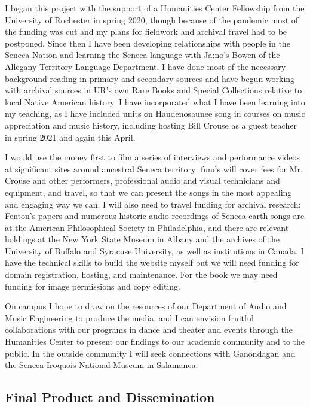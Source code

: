 \documentclass{neh}
\begin{document}
I began this project with the support of a Humanities Center Fellowship from
the University of Rochester in spring 2020, though because of the pandemic
most of the funding was cut and my plans for fieldwork and archival travel had
to be postponed.
Since then I have been developing relationships with people in the Seneca
Nation and learning the Seneca language with Ja:no's Bowen of the Allegany
Territory Language Department.
I have done most of the necessary background reading in primary and secondary
sources and have begun working with archival sources in UR's own Rare Books and
Special Collections relative to local Native American history.
I have incorporated what I have been learning into my teaching, as I have
included units on Haudenosaunee song in courses on music appreciation and
music history, including hosting Bill Crouse as a guest teacher in spring 2021
and again this April.


I would use the money first to film a series of interviews and performance
videos at significant sites around ancestral Seneca territory: funds will
cover fees for Mr. Crouse and other performers, professional audio and visual
technicians and equipment, and travel, so that we can present the songs in the
most appealing and engaging way we can.
I will also need to travel funding for archival research: Fenton's papers
and numerous historic audio recordings of Seneca earth songs are at the
American Philosophical Society in Philadelphia, and there are relevant
holdings at the New York State Museum in Albany and the archives of the
University of Buffalo and Syracuse University, as well as institutions in
Canada.
I have the technical skills to build the website myself but we will need
funding for domain registration, hosting, and maintenance.
For the book we may need funding for image permissions and copy editing.

On campus I hope to draw on the resources of our Department of Audio and Music
Engineering to produce the media, and I can envision fruitful collaborations
with our programs in dance and theater and events through the Humanities
Center to present our findings to our academic community and to the public.
In the outside community I will seek connections with Ganondagan and the
Seneca-Iroquois National Museum in Salamanca.

\subsection{Final Product and Dissemination}
\end{document}
